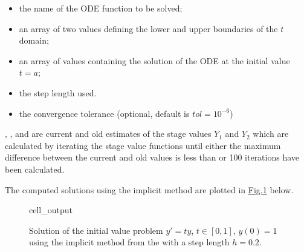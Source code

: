 \documentclass[letterpaper,10pt,english]{jupyterBook}
\begin{document}
\begin{itemize}
\item {} 
\sphinxAtStartPar
{} \sphinxhyphen{} the name of the ODE function to be solved;

\item {} 
\sphinxAtStartPar
{} \sphinxhyphen{} an array of two values defining the lower and upper boundaries of the \(t\) domain;

\item {} 
\sphinxAtStartPar
{} \sphinxhyphen{} an array of values containing the solution of the ODE at the initial value \(t=a\);

\item {} 
\sphinxAtStartPar
{} \sphinxhyphen{} the step length used.

\item {} 
\sphinxAtStartPar
{} \sphinxhyphen{} the convergence tolerance (optional, default is \(tol=10^{-6}\))

\end{itemize}

\sphinxAtStartPar
{}, ,  and  are current and old estimates of the stage values \(Y_1\) and \(Y_2\) which are calculated by iterating the stage value functions until either the maximum difference between the current and old values is less than  or 100 iterations have been calculated.

\sphinxAtStartPar
The computed solutions using the implicit method are plotted in \hyperref[\detokenize{3_IRKs/3.2_Solving_IVPs_using_IRK_methods:irk-example-1-figure}]{Fig.\@ \ref{\detokenize{3_IRKs/3.2_Solving_IVPs_using_IRK_methods:irk-example-1-figure}}} below.

\begin{figure}[htbp]
\centering
\capstart
\begin{sphinxVerbatimOutput}

\begin{sphinxuseclass}{cell_output}
\noindent{}

\end{sphinxuseclass}\end{sphinxVerbatimOutput}
\caption{Solution of the initial value problem \(y'=ty\), \(t\in[0,1]\), \(y(0)=1\) using the implicit method from the {\hyperref[\detokenize{3_IRKs/3.2_Solving_IVPs_using_IRK_methods:irk-example-1}]{}} with a step length \(h=0.2\).}\label{\detokenize{3_IRKs/3.2_Solving_IVPs_using_IRK_methods:irk-example-1-figure}}\end{figure}
\end{document}
